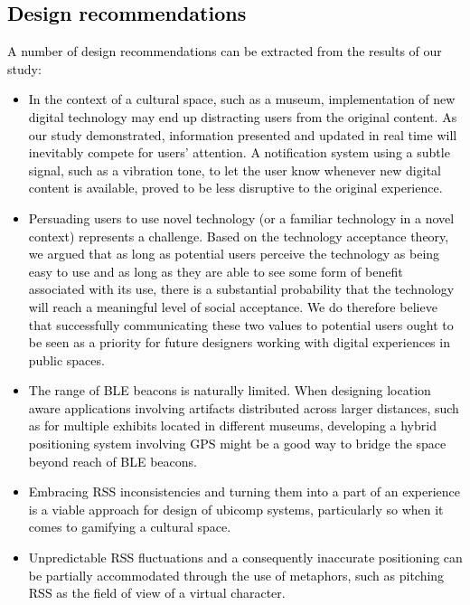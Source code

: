 \documentclass[prodmode,acmtomm]{acmsmall}
\begin{document}
\textcolor{black}{
\subsection{Design recommendations}
A number of design recommendations can be extracted from the results of our study: \begin{itemize}
  \item In the context of a cultural space, such as a museum, implementation of new digital technology may end up distracting users from the original content. As our study demonstrated, information presented and updated in real time will inevitably compete for users’ attention. A notification system using a subtle signal, such as a vibration tone, to let the user know whenever new digital content is available, proved to be less disruptive to the original experience. 
\item Persuading users to use novel technology (or a familiar technology in a novel context) represents a challenge. Based on the technology acceptance theory, we argued that as long as potential users perceive the technology as being easy to use and as long as they are able to see some form of benefit associated with its use, there is a substantial probability that the technology will reach a meaningful level of social acceptance. We do therefore believe that successfully communicating these two values to potential users ought to be seen as a priority for future designers working with digital experiences in public spaces. 
\item The range of BLE beacons is naturally limited. When designing location aware applications involving artifacts distributed across larger distances, such as for multiple exhibits located in different museums, developing a hybrid positioning system involving GPS might be a good way to bridge the space beyond reach of BLE beacons. 
  \item Embracing RSS inconsistencies and turning them into a part of an experience is a viable approach for design of ubicomp systems, particularly so when it comes to gamifying a cultural space. 
  \item Unpredictable RSS fluctuations and a consequently inaccurate positioning can be partially accommodated through the use of metaphors, such as pitching RSS as the field of view of a virtual character. 
\end{itemize}
}
\vspace{-8pt}
\end{document}
